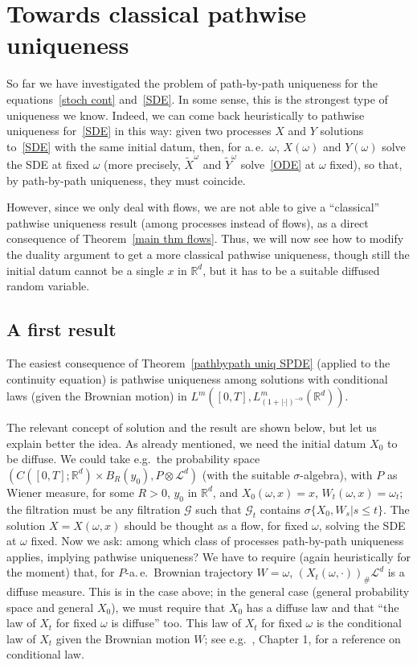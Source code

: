 \documentclass[a4paper,10pt]{article}
\newcommand{\mr}{\mathbb{R}}
\newcommand{\mc}{\mathcal}
\newcommand{\td}{\tilde}
\begin{document}
\section{Towards classical pathwise uniqueness}

So far we have investigated the problem of path-by-path uniqueness for the equations~\eqref{stoch cont} and~\eqref{SDE}. In some sense, this is the strongest type of uniqueness we know. Indeed, we can come back heuristically to pathwise uniqueness for~\eqref{SDE} in this way: given two processes $X$ and $Y$ solutions to~\eqref{SDE} with the same initial datum, then, for a.\,e.\ $\omega$, $X(\omega)$ and $Y(\omega)$ solve the SDE at fixed $\omega$ (more precisely, $\td{X}^\omega$ and $\td{Y}^\omega$ solve~\eqref{ODE} at $\omega$ fixed), so that, by path-by-path uniqueness, they must coincide.

However, since we only deal with flows, we are not able to give a ``classical'' pathwise uniqueness result (among processes instead of flows), as a direct consequence of Theorem~\ref{main thm flows}. Thus, we will now see how to modify the duality argument to get a more classical pathwise uniqueness, though still the initial datum cannot be a single $x$ in $\mr^d$, but it has to be a suitable diffused random variable.

\subsection{A first result}\label{firstpathwise}

The easiest consequence of Theorem~\ref{pathbypath uniq SPDE} (applied to the continuity equation) is pathwise uniqueness among solutions with conditional laws (given the Brownian motion) in $L^m([0,T],L^m_{(1+|\cdot|)^{-\alpha}}(\mr^d))$.

The relevant concept of solution and the result are shown below, but let us explain better the idea. As already mentioned, we need the initial datum $X_0$ to be diffuse. We could take e.g.\ the probability space $(C([0,T];\mr^d)\times B_R(y_0),P\otimes\mc{L}^d)$ (with the suitable $\sigma$-algebra), with $P$ as Wiener measure, for some $R>0$, $y_0$ in $\mr^d$, and $X_0(\omega,x)=x$, $W_t(\omega,x)=\omega_t$; the filtration must be any filtration $\mc{G}$ such that $\mc{G}_t$ contains $\sigma\{X_0,W_s|s\le t\}$. The solution $X=X(\omega,x)$ should be thought as a flow, for fixed $\omega$, solving the SDE at $\omega$ fixed. Now we ask: among which class of processes path-by-path uniqueness applies, implying pathwise uniqueness? We have to require (again heuristically for the moment) that, for $P$-a.\,e.\ Brownian trajectory $W=\omega$, $(X_t(\omega,\cdot))_\#\mc{L}^d$ is a diffuse measure. This is in the case above; in the general case (general probability space and general $X_0$), we must require that $X_0$ has 
a diffuse law and that ``the law of $X_t$ for fixed $\omega$ is diffuse'' too. This law of $X_t$ for fixed $\omega$ is the conditional law of $X_t$ given the Brownian motion $W$; see e.g.\ \cite{StrVar}, Chapter 1, for a reference on conditional law.
\end{document}
